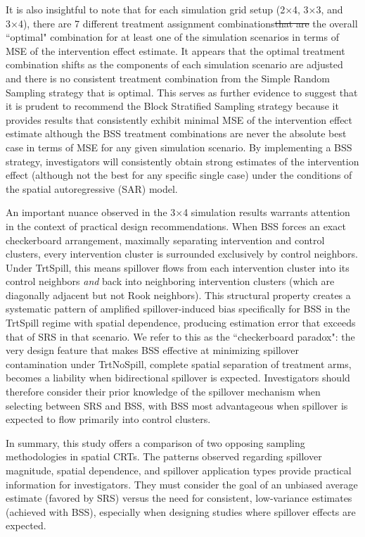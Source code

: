 \documentclass{article}[11pt]
\makeatletter
\providecommand{\DIFaddtex}[1]{{\protect\color{blue}\uwave{#1}}} %
\providecommand{\DIFdeltex}[1]{{\protect\color{red}\sout{#1}}} %
\providecommand{\DIFaddbegin}{} %
\providecommand{\DIFaddend}{} %
\providecommand{\DIFdelbegin}{} %
\providecommand{\DIFdelend}{} %
\providecommand{\DIFadd}[1]{\texorpdfstring{\DIFaddtex{#1}}{#1}} %
\providecommand{\DIFdel}[1]{\texorpdfstring{\DIFdeltex{#1}}{}} %
\providecommand{\DIFscaledelfig}{0.5}
\newlength{\DIFdelgraphicswidth} %
\newlength{\DIFdelgraphicsheight} %
\providecommand{\DIFaddincludegraphics}[2][]{{\color{blue}\fbox{\DIFOincludegraphics[#1]{#2}}}} %
\providecommand{\DIFdelincludegraphics}[2][]{%
\sbox{\DIFdelgraphicsbox}{\DIFOincludegraphics[#1]{#2}}%
\settoboxwidth{\DIFdelgraphicswidth}{\DIFdelgraphicsbox} %
\settoboxtotalheight{\DIFdelgraphicsheight}{\DIFdelgraphicsbox} %
\scalebox{\DIFscaledelfig}{%
\parbox[b]{\DIFdelgraphicswidth}{\usebox{\DIFdelgraphicsbox}\\[-\baselineskip] \rule{\DIFdelgraphicswidth}{0em}}\llap{\resizebox{\DIFdelgraphicswidth}{\DIFdelgraphicsheight}{%
\setlength{\unitlength}{\DIFdelgraphicswidth}%
\begin{picture}(1,1)%
\thicklines\linethickness{2pt} %
{\color[rgb]{1,0,0}\put(0,0){\framebox(1,1){}}}%
{\color[rgb]{1,0,0}\put(0,0){\line( 1,1){1}}}%
{\color[rgb]{1,0,0}\put(0,1){\line(1,-1){1}}}%
\end{picture}%
}\hspace*{3pt}}} %
} %
\DeclareRobustCommand{\DIFaddbegin}{\DIFOaddbegin \let\includegraphics\DIFaddincludegraphics} %
\DeclareRobustCommand{\DIFaddend}{\DIFOaddend \let\includegraphics\DIFOincludegraphics} %
\DeclareRobustCommand{\DIFdelbegin}{\DIFOdelbegin \let\includegraphics\DIFdelincludegraphics} %
\DeclareRobustCommand{\DIFdelend}{\DIFOaddend \let\includegraphics\DIFOincludegraphics} %
\let\sout@orig\sout %
\renewcommand{\sout}[1]{\ifmmode\text{\sout@orig{\ensuremath{#1}}}\else\sout@orig{#1}\fi} %
\makeatother
\begin{document}
It is also insightful to note that for each simulation grid setup (2×4, 3×3, and 3×4), there are 7 different treatment assignment combinations\DIFdelbegin \DIFdel{that are }\DIFdelend \DIFaddbegin \DIFadd{, each of which is }\DIFaddend the overall ``optimal" combination for at least one of the simulation scenarios in terms of MSE of the intervention effect estimate. It appears that the optimal treatment combination shifts as the components of each simulation scenario are adjusted and there is no consistent treatment combination from the Simple Random Sampling strategy that is optimal. This serves as further evidence to suggest that it is prudent to recommend the Block Stratified Sampling strategy because it provides results that consistently exhibit minimal MSE of the intervention effect estimate although the BSS treatment combinations are never the absolute best case in terms of MSE for any given simulation scenario. By implementing a BSS strategy, investigators will consistently obtain strong estimates of the intervention effect (although not the best for any specific single case) under the conditions of the spatial autoregressive (SAR) model.

An important nuance observed in the 3$\times$4 simulation results warrants attention in the context of practical design recommendations. When BSS forces an exact checkerboard arrangement, maximally separating intervention and control clusters, every intervention cluster is surrounded exclusively by control neighbors. Under TrtSpill, this means spillover flows from each intervention cluster into its control neighbors \emph{and} back into neighboring intervention clusters (which are diagonally adjacent but not Rook neighbors). This structural property creates a systematic pattern of amplified spillover-induced bias specifically for BSS in the TrtSpill regime with spatial dependence, producing estimation error that exceeds that of SRS in that scenario. We refer to this as the ``checkerboard paradox": the very design feature that makes BSS effective at minimizing spillover contamination under TrtNoSpill, complete spatial separation of treatment arms, becomes a liability when bidirectional spillover is expected. Investigators should therefore consider their prior knowledge of the spillover mechanism when selecting between SRS and BSS, with BSS most advantageous when spillover is expected to flow primarily into control clusters.

In summary, this study offers a comparison of two opposing sampling methodologies in spatial CRTs. The patterns observed regarding spillover magnitude, spatial dependence, and spillover application types provide practical information for investigators. They must consider the goal of an unbiased average estimate (favored by SRS) versus the need for consistent, low-variance estimates (achieved with BSS), especially when designing studies where spillover effects are expected.
\end{document}
